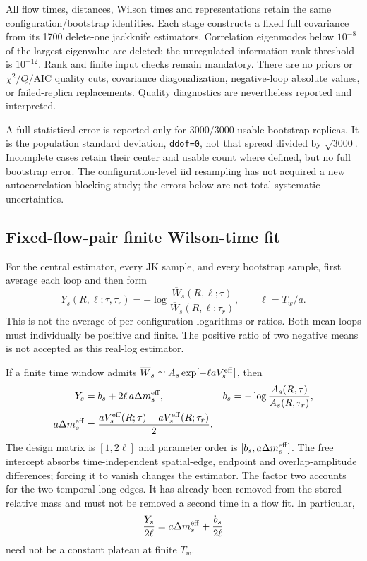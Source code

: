 \documentclass[11pt]{article}
\numberwithin{equation}{section}
\begin{document}
All flow times, distances, Wilson times and representations retain the
same configuration/bootstrap identities. Each stage constructs a fixed
full covariance from its 1700 delete-one jackknife estimators. Correlation
eigenmodes below \(10^{-8}\) of the largest eigenvalue are deleted; the
unregulated information-rank threshold is \(10^{-12}\). Rank and finite
input checks remain mandatory. There are no priors or
\(\chi^2/Q/\mathrm{AIC}\) quality cuts, covariance diagonalization,
negative-loop absolute values, or failed-replica replacements. Quality
diagnostics are nevertheless reported and interpreted.

A full statistical error is reported only for 3000/3000 usable bootstrap
replicas. It is the population standard deviation, \texttt{ddof=0}, not
that spread divided by \(\sqrt{3000}\). Incomplete cases retain their
center and usable count where defined, but no full bootstrap error. The
configuration-level iid resampling has not acquired a new autocorrelation
blocking study; the errors below are not total systematic uncertainties.

\subsection{Fixed-flow-pair finite Wilson-time fit}

For the central estimator, every JK sample, and every bootstrap sample,
first average each loop and then form
\begin{equation}
 Y_s(R,\ell;\tau,\tau_r)
 =-\log\frac{\overline W_s(R,\ell;\tau)}
                 {\overline W_s(R,\ell;\tau_r)},
 \qquad \ell=T_w/a.
 \label{eq:line-mass-oct20-logratio}
\end{equation}
This is not the average of per-configuration logarithms or ratios. Both
mean loops must individually be positive and finite. The positive ratio
of two negative means is not accepted as this real-log estimator.

If a finite time window admits
\(\overline W_s\simeq A_s\exp[-\ell aV_s^{\rm eff}]\), then
\begin{align}
 Y_s&=b_s+2\ell\,a\Delta m_s^{\rm eff},
 &b_s&=-\log\frac{A_s(R,\tau)}{A_s(R,\tau_r)},
 \label{eq:line-mass-oct20-time-fit}\\
 a\Delta m_s^{\rm eff}
 &=\frac{aV_s^{\rm eff}(R;\tau)-aV_s^{\rm eff}(R;\tau_r)}{2}.
 \label{eq:line-mass-oct20-factor-two}
\end{align}
The design matrix is \([1,2\ell]\) and parameter order is
\([b_s,a\Delta m_s^{\rm eff}]\). The free intercept absorbs
time-independent spatial-edge, endpoint and overlap-amplitude differences;
forcing it to vanish changes the estimator. The factor two accounts for
the two temporal long edges. It has already been removed from the stored
relative mass and must not be removed a second time in a flow fit.
In particular,
\begin{equation}
 \frac{Y_s}{2\ell}=a\Delta m_s^{\rm eff}+\frac{b_s}{2\ell}
 \label{eq:line-mass-oct20-finite-time}
\end{equation}
need not be a constant plateau at finite \(T_w\).
\end{document}
